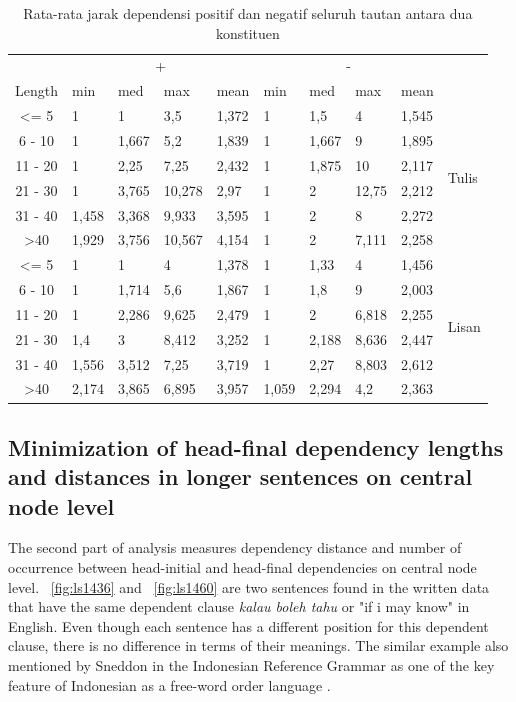 \documentclass[10pt, a4paper, conference, compsocconf]{IEEEtran}
\begin{document}
\begin{table}
\begin{center}
\caption{Rata-rata jarak dependensi positif dan negatif seluruh tautan antara dua konstituen}  \label{tab:deskriptif-mdd}
\begin{tabular}{c l l l l l l l l l}
\hline
 & \multicolumn{4}{c}{+} & \multicolumn{4}{c}{-} & \\  \cline{2-9}  
Length & min 	& med	& max 	& mean 	& min 	& med 	& max 	& mean 	& \\ \cline{1-10}  
\textless= 5 	& 1 		& 1 		& 3,5	 	& 1,372 	& 1 		& 1,5 	& 4	 	& 1,545 	&\multirow{6}{*}{Tulis}\\
6 - 10 		& 1 		& 1,667	& 5,2 	& 1,839 	& 1 		& 1,667 	& 9	 	& 1,895 	& 	\\
11 - 20 		& 1 		& 2,25 	& 7,25 	& 2,432 	& 1 		& 1,875 	& 10	 	& 2,117 	& 	\\
21 - 30 		& 1 		& 3,765 	& 10,278 	& 2,97 	& 1 		& 2 		& 12,75	& 2,212 	& 	\\ 
31 - 40 		& 1,458 	& 3,368 	& 9,933	& 3,595 	& 1 		& 2 		& 8		& 2,272 	& 	\\
\textgreater 40 	& 1,929 	& 3,756	& 10,567 	& 4,154 	& 1 		& 2 		& 7,111	& 2,258 	& 	\\ 
\hline
\textless= 5 	& 1 		& 1 		& 4	 	& 1,378 	& 1 		& 1,33 	& 4		& 1,456 	& \multirow{6}{*}{Lisan}\\
6 - 10 		& 1 		& 1,714	& 5,6 	& 1,867 	& 1 		& 1,8		& 9		& 2,003 	& \\
11 - 20 		& 1 		& 2,286 	& 9,625 	& 2,479 	& 1 		& 2 		& 6,818	& 2,255 	& \\
21 - 30 		& 1,4 	& 3	 	& 8,412 	& 3,252	& 1 		& 2,188	& 8,636	& 2,447 	& \\ 
31 - 40 		& 1,556 	& 3,512 	& 7,25	& 3,719 	& 1 		& 2,27	& 8,803	& 2,612 	& \\
\textgreater 40 	& 2,174 	& 3,865	& 6,895 	& 3,957 	& 1,059 	& 2,294	& 4,2		& 2,363 	& \\ 
\hline
   \end{tabular}
\end{center}
\end{table}

\subsection{Minimization of head-final dependency lengths and distances in longer sentences on central node level}
The second part of analysis measures dependency distance and number of occurrence between head-initial and head-final dependencies on central node level. \pic~\ref{fig:ls1436} and \pic~\ref{fig:ls1460} are two sentences found in the written data that have the same dependent clause \textit{kalau boleh tahu} or "if i may know" in English. Even though each sentence has a different position for this dependent clause, there is no difference in terms of their meanings. The similar example also mentioned by Sneddon in the Indonesian Reference Grammar as one of the key feature of Indonesian as a free-word order language \cite{sneddon2010indonesian}.
\end{document}
